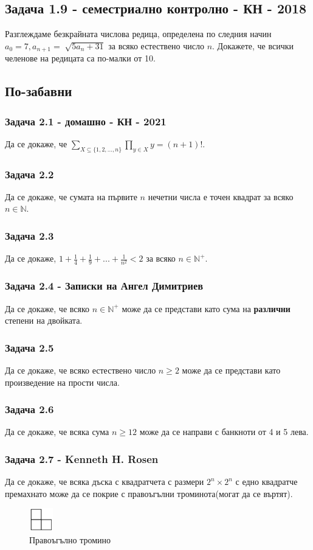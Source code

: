 \documentclass[12pt]{article}
\begin{document}
\subsection*{Задача 1.9 - семестриално контролно - КН - 2018}
Разглеждаме безкрайната числова редица, определена по следния начин $a_0 = 7, a_{n+1} = \sqrt[]{5a_n + 31}$ за всяко естествено число $n$. Докажете, че всички челенове на редицата са по-малки от 10.

\subsection*{По-забавни}
\subsubsection*{Задача 2.1 - домашно - КН - 2021}
Да се докаже, че $\displaystyle\sum_{X \subseteq \{ 1, 2, ..., n \}} \prod_{y \in X} y = (n+1)!$.
\subsubsection*{Задача 2.2}
Да се докаже, че сумата на първите $n$ нечетни числа е точен квадрат за всяко $n \in \mathbb{N}$.
\subsubsection*{Задача 2.3}
Да се докаже, $1 + \frac{1}{4} + \frac{1}{9} + ... + \frac{1}{n^2} < 2$ за всяко $n \in \mathbb{N}^+$.
\subsubsection*{Задача 2.4 - Записки на Ангел Димитриев}
Да се докаже, че всяко $n \in \mathbb{N}^+$ може да се представи като сума на \textbf{различни} степени на двойката.
\subsubsection*{Задача 2.5}
Да се докаже, че всяко естествено число $n \geq 2$ може да се представи като произведение на прости числа.
\subsubsection*{Задача 2.6}
Да се докаже, че всяка сума $n \geq 12$ може да се направи с банкноти от 4 и 5 лева.
\subsubsection*{Задача 2.7 - Kenneth H. Rosen}
Да се докаже, че всяка дъска с квадратчета с размери $2^n \times 2^n$ с едно квадратче премахнато може да се покрие с правоъгълни троминота(могат да се въртят).
\begin{figure}[!ht]
    \caption*{Правоъгълно тромино}
    \centering
    \includegraphics[height=1cm]{right-trominoe}
\end{figure}
\end{document}
